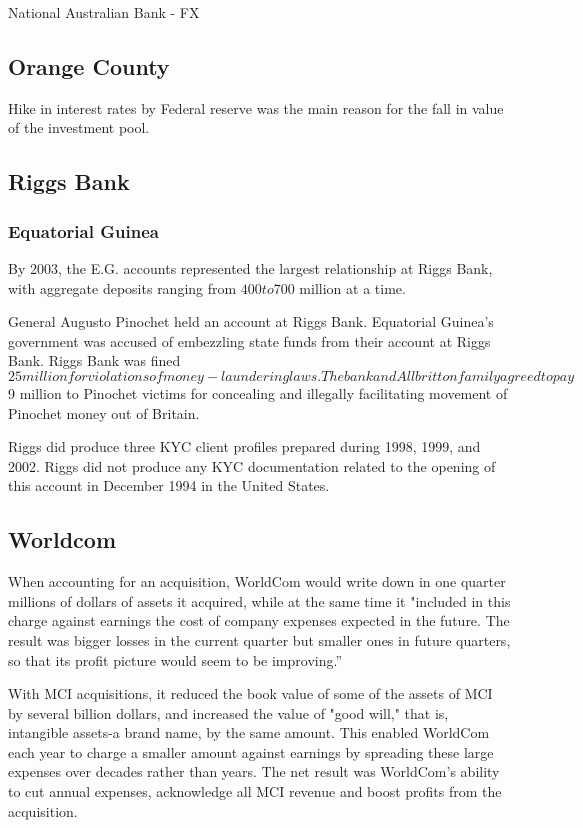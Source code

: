 National Australian Bank - FX

\subsection{Orange County}
Hike in interest rates by Federal reserve was the main reason for the fall in value of the investment pool.

\subsection{Riggs Bank }
\subsubsection{Equatorial Guinea}
By 2003, the E.G. accounts represented the largest relationship at Riggs Bank, with aggregate deposits ranging from $400 to $700 million at a time.
 

General Augusto Pinochet held an account at Riggs Bank.
Equatorial Guinea's government was accused of embezzling state funds from their account at Riggs Bank.
Riggs Bank was fined $25 million for violations of money-laundering laws.
The bank and Allbritton family agreed to pay $9 million to Pinochet victims for concealing and illegally facilitating movement of Pinochet money out of Britain.

Riggs did produce three KYC client profiles prepared during 1998, 1999, and 2002. Riggs did not produce any KYC documentation related to the opening of this account in December 1994 in the United States.


\subsection{Worldcom}
When accounting for an acquisition, WorldCom would write down in one quarter millions of dollars of assets it acquired, while at the same time it "included in this charge against earnings the cost of company expenses expected in the future. The result was bigger losses in the current quarter but smaller ones in future quarters, so that its profit picture would seem to be improving.”  
 
With MCI acquisitions, it reduced the book value of some of the assets of MCI by several billion dollars, and increased the value of "good will," that is, intangible assets-a brand name, by the same amount.
This enabled WorldCom each year to charge a smaller amount against earnings by spreading these large expenses over decades rather than years. The net result was WorldCom's ability to cut annual expenses, acknowledge all MCI revenue and boost profits from the acquisition.  
 
